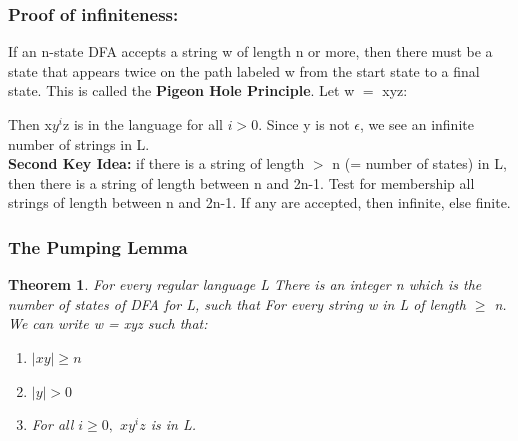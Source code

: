 \documentclass{report}
\newtheorem{theorem}{Theorem}
\begin{document}
\subsubsection{Proof of infiniteness:}
If an n-state DFA accepts a string w of length n or more, then there must be a state that appears twice on the path labeled w from the start state to a final state. This is called the \textbf{Pigeon Hole Principle}. Let w $=$ xyz:
\begin{figure}[ht] 
    \centering 
\end{figure}
Then x$y^i$z is in the language for all $i>0$. Since y is not $\epsilon$, we see an infinite number of strings in L. \\
\textbf{Second Key Idea:} if there is a string of length $>$ n (= number of states) in L, then there is a string of length between n and 2n-1.
Test for membership all strings of length between n and 2n-1. If any are accepted, then infinite, else finite. \\

\subsubsection{The Pumping Lemma}
\begin{theorem}
For every regular language L There is an integer n which is the number of states of DFA for L, such that For every string w in L of length $\geqslant$ n. We can write w = xyz such that:
\begin{enumerate}
    \item $|xy| \geqslant n$
    \item $|y| > 0$
    \item For all $i \geqslant 0,$ $x y^i z$ is in L.
\end{enumerate}
\end{theorem}
\end{document}

